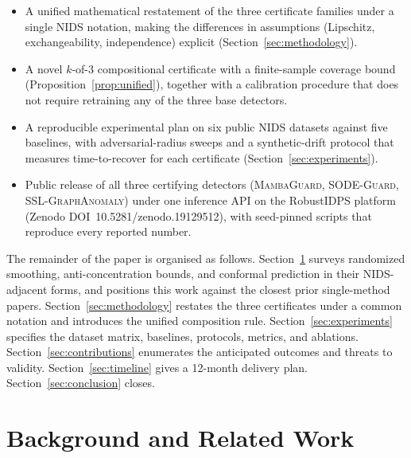 \documentclass[journal,twoside]{IEEEtran}
\begin{document}
\begin{itemize}[leftmargin=1.5em]
  \item[\textbf{C1.}] A unified mathematical restatement of the three
        certificate families under a single NIDS notation, making the
        differences in assumptions (Lipschitz, exchangeability,
        independence) explicit (Section~\ref{sec:methodology}).
  \item[\textbf{C2.}] A novel $k$-of-$3$ compositional certificate with
        a finite-sample coverage bound (Proposition~\ref{prop:unified}),
        together with a calibration procedure that does not require
        retraining any of the three base detectors.
  \item[\textbf{C3.}] A reproducible experimental plan on six public
        NIDS datasets against five baselines, with adversarial-radius
        sweeps and a synthetic-drift protocol that measures
        time-to-recover for each certificate
        (Section~\ref{sec:experiments}).
  \item[\textbf{C4.}] Public release of all three certifying detectors
        (\textsc{MambaGuard}, \textsc{SODE-Guard},
        \textsc{SSL-GraphAnomaly}) under one inference API on the
        RobustIDPS platform (Zenodo DOI~10.5281/zenodo.19129512), with
        seed-pinned scripts that reproduce every reported number.
\end{itemize}

The remainder of the paper is organised as follows.
Section~\ref{sec:related} surveys randomized smoothing, anti-concentration
bounds, and conformal prediction in their NIDS-adjacent forms, and
positions this work against the closest prior single-method papers.
Section~\ref{sec:methodology} restates the three certificates under a
common notation and introduces the unified composition rule.
Section~\ref{sec:experiments} specifies the dataset matrix, baselines,
protocols, metrics, and ablations.
Section~\ref{sec:contributions} enumerates the anticipated outcomes and
threats to validity. Section~\ref{sec:timeline} gives a 12-month
delivery plan. Section~\ref{sec:conclusion} closes.

\section{Background and Related Work}\label{sec:related}
\end{document}

